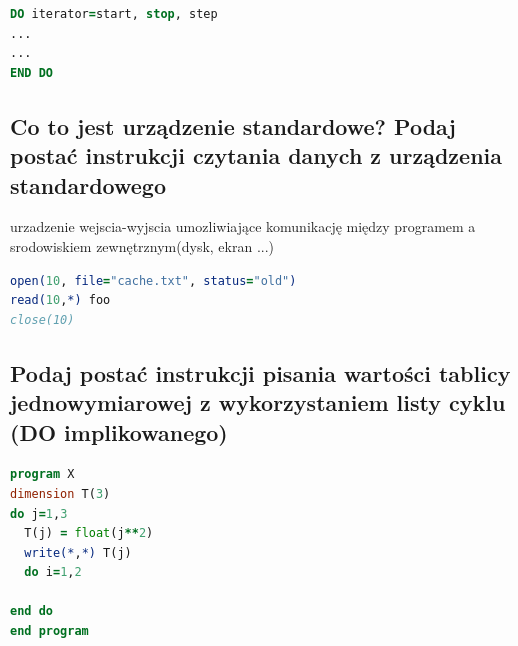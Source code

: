 \begin{lstlisting}[language=Fortran, caption=cos]
DO iterator=start, stop, step
...
...
END DO 
\end{lstlisting}

\subsection{Co to jest urządzenie standardowe? Podaj postać instrukcji czytania danych z urządzenia standardowego}
urzadzenie wejscia-wyjscia umozliwiające komunikację między programem a srodowiskiem zewnętrznym(dysk, ekran ...)

\begin{lstlisting}[language=Fortran, caption=cos]
open(10, file="cache.txt", status="old")
read(10,*) foo
close(10)
\end{lstlisting}

\subsection{Podaj postać instrukcji pisania wartości tablicy jednowymiarowej z wykorzystaniem listy cyklu (DO implikowanego)}
\begin{lstlisting}[language=Fortran, caption=cos]
program X
dimension T(3)
do j=1,3
  T(j) = float(j**2)
  write(*,*) T(j)
  do i=1,2
    
end do
end program
\end{lstlisting}


